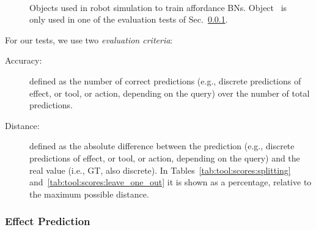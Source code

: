 \begin{figure}
\centering
{} \quad
%
 \quad
%
 \quad
%
 \\
%
 \quad
%
 \quad
%
 \quad
%
%
\caption[Objects used in robot simulation to train affordance \aclp{BN}.]{Objects used in robot simulation to train affordance \aclp{BN}. Object~ is only used
in one of the evaluation tests of Sec.~\ref{sec:tool:results:bns:effect_prediction}.%
}
\label{fig:tool:sim_objects}
\end{figure}

For our tests, we use two \emph{evaluation criteria}:

\begin{description}
\item[Accuracy:] defined as the number of correct predictions (e.g., discrete predictions of effect, or tool, or action, depending on the query) over the number of total predictions.

\item[Distance:] defined as the absolute difference
between the prediction (e.g., discrete predictions of effect, or tool, or action, depending on the query) and the real value (i.e., \acl{GT}, also discrete).
In Tables~\ref{tab:tool:scores:splitting} and~\ref{tab:tool:scores:leave_one_out}
it is shown as a percentage, relative to the maximum possible distance.
\end{description}

\subsubsection{Effect Prediction}
\label{sec:tool:results:bns:effect_prediction}

